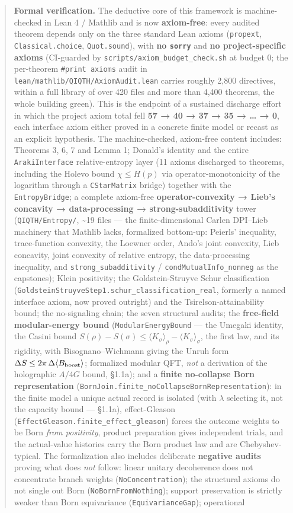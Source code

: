 \documentclass[11pt,a4paper]{article}
\begin{document}
\begin{abstract}
\textbf{Formal verification.} The deductive core of this framework is machine-checked in Lean 4 / Mathlib and is now \textbf{axiom-free}: every audited theorem depends only on the three standard Lean axioms (\texttt{propext}, \texttt{Classical.choice}, \texttt{Quot.sound}), with \textbf{no \texttt{sorry}} and \textbf{no project-specific axioms} (CI-guarded by \texttt{scripts/axiom\_budget\_check.sh} at budget 0; the per-theorem \texttt{\#print axioms} audit in \texttt{lean/mathlib/QIQTH/AxiomAudit.lean} carries roughly 2,800 directives, within a full library of over 420 files and more than 4,400 theorems, the whole building green). This is the endpoint of a sustained discharge effort in which the project axiom total fell \textbf{57 → 40 → 37 → 35 → … → 0}, each interface axiom either proved in a concrete finite model or recast as an explicit hypothesis. The machine-checked, axiom-free content includes: Theorems 3, 6, 7 and Lemma 1; Donald's identity and the entire \texttt{ArakiInterface} relative-entropy layer (11 axioms discharged to theorems, including the Holevo bound $\chi \le H(p)$ via operator-monotonicity of the logarithm through a \texttt{CStarMatrix} bridge) together with the \texttt{EntropyBridge}; a complete axiom-free \textbf{operator-convexity → Lieb's concavity → data-processing → strong-subadditivity} tower (\texttt{QIQTH/Entropy/}, \textasciitilde{}19 files — the finite-dimensional Carlen DPI–Lieb machinery that Mathlib lacks, formalized bottom-up: Peierls' inequality, trace-function convexity, the Loewner order, Ando's joint convexity, Lieb concavity, joint convexity of relative entropy, the data-processing inequality, and \texttt{strong\_subadditivity} / \texttt{condMutualInfo\_nonneg} as the capstones); Klein positivity; the Goldstein-Struyve Schur classification (\texttt{GoldsteinStruyveStep1.schur\_classification\_real}, formerly a named interface axiom, now proved outright) and the Tsirelson-attainability bound; the no-signaling chain; the seven structural audits; the \textbf{free-field modular-energy bound} (\texttt{ModularEnergyBound} — the Umegaki identity, the Casini bound $S(\rho)-S(\sigma)\le\langle K_\sigma\rangle_\rho-\langle K_\sigma\rangle_\sigma$, the first law, and its rigidity, with Bisognano–Wichmann giving the Unruh form $\Delta S \le 2\pi\,\Delta\langle B_{\rm boost}\rangle$; formalized modular QFT, \emph{not} a derivation of the holographic $A/4G$ bound, §1.1a); and a \textbf{finite no-collapse Born representation} (\texttt{BornJoin.finite\_noCollapseBornRepresentation}): in the finite model a unique actual record is isolated (with $\lambda$ selecting it, not the capacity bound — §1.1a), effect-Gleason (\texttt{EffectGleason.finite\_effect\_gleason}) forces the outcome weights to be Born \emph{from positivity}, product preparation gives independent trials, and the actual-value histories carry the Born product law and are Chebyshev-typical. The formalization also includes deliberate \textbf{negative audits} proving what does \emph{not} follow: linear unitary decoherence does not concentrate branch weights (\texttt{NoConcentration}); the structural axioms do not single out Born (\texttt{NoBornFromNothing}); support preservation is strictly weaker than Born equivariance (\texttt{EquivarianceGap}); operational 
\end{abstract}
\end{document}
